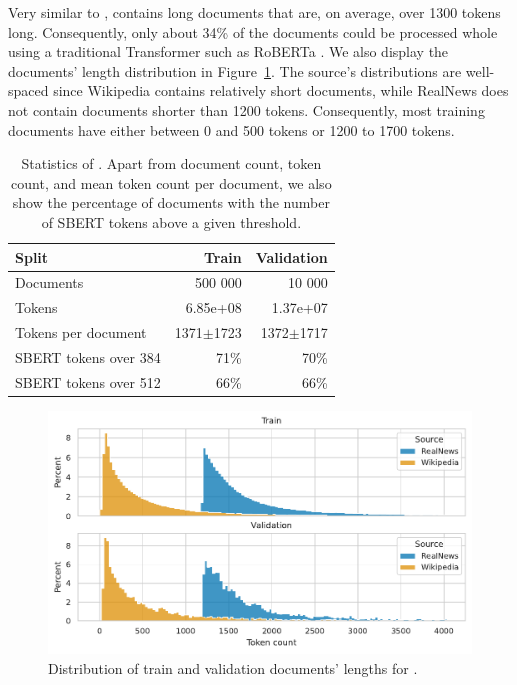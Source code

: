 Very similar to ,  contains long documents
that are, on average, over 1300 tokens long. Consequently, only about 34\% of
the documents could be processed whole using a traditional Transformer such as
RoBERTa \citep{liu2019roberta}. We also display the documents' length
distribution in Figure~\ref{fig:val_data_dist}. The source's distributions are
well-spaced since Wikipedia contains relatively short documents, while RealNews
does not contain documents shorter than 1200 tokens. Consequently, most
training documents have either between 0 and 500 tokens or 1200 to 1700 tokens.

\begin{table}
  \centering
  \footnotesize

  \begin{tabular}{lrr}
    \toprule
      Split & Train & Validation \\
    \midrule
      Documents & 500 000 & 10 000 \\
      Tokens & 6.85e+08 & 1.37e+07 \\
      Tokens per document & 1371$\pm$1723 & 1372$\pm$1717 \\
      SBERT tokens over 384 & 71\% & 70\% \\
      SBERT tokens over 512 & 66\% & 66\% \\
    \bottomrule
  \end{tabular}

  \caption{Statistics of . Apart from document count, token
  count, and mean token count per document, we also show the percentage of documents
  with the number of SBERT tokens above a given threshold.}

  \label{table:val_data_stats}

\end{table}

\begin{figure}

  \includegraphics[width=\textwidth]{./img/val_data_dist.pdf}

  \caption{Distribution of train and validation documents' lengths for
  .}

  \label{fig:val_data_dist}

\end{figure}

